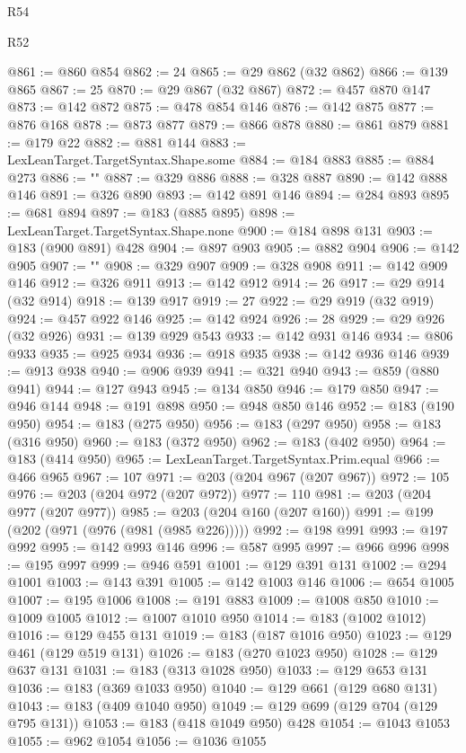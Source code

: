 \begin{lexlean}{R54}
\begin{lexlean}{R52}
\begin{coremodule}
{{{{{{{{{{{{{{{{{{{{{{{{{{{{{{{{{{{{{{{{{{{{{{{{{{{{{{{{{{{{{{{{{{{{{{{{{{{{{{{{{{{{{{{{{{{{{{{{{{{{{{{{{{{{{{{{{{{{{{{{{{{{{{{{{{{{{{{{{{{{{{{{{{{{{{{{{{{{{{{{{{{{{{{{{{{{{{{{{{{{{{{{{{{{{{{{{{{{{{@861 := @860 @854
@862 := 24
@865 := @29 @862 (@32 @862)
@866 := @139 @865
@867 := 25
@870 := @29 @867 (@32 @867)
@872 := @457 @870 @147
@873 := @142 @872
@875 := @478 @854 @146
@876 := @142 @875
@877 := @876 @168
@878 := @873 @877
@879 := @866 @878
@880 := @861 @879
@881 := @179 @22
@882 := @881 @144
@883 := LexLeanTarget.TargetSyntax.Shape.some
@884 := @184 @883
@885 := @884 @273
@886 := "{"
@887 := @329 @886
@888 := @328 @887
@890 := @142 @888 @146
@891 := @326 @890
@893 := @142 @891 @146
@894 := @284 @893
@895 := @681 @894
@897 := @183 (@885 @895)
@898 := LexLeanTarget.TargetSyntax.Shape.none
@900 := @184 @898 @131
@903 := @183 (@900 @891) @428
@904 := @897 @903
@905 := @882 @904
@906 := @142 @905
@907 := "}"
@908 := @329 @907
@909 := @328 @908
@911 := @142 @909 @146
@912 := @326 @911
@913 := @142 @912
@914 := 26
@917 := @29 @914 (@32 @914)
@918 := @139 @917
@919 := 27
@922 := @29 @919 (@32 @919)
@924 := @457 @922 @146
@925 := @142 @924
@926 := 28
@929 := @29 @926 (@32 @926)
@931 := @139 @929 @543
@933 := @142 @931 @146
@934 := @806 @933
@935 := @925 @934
@936 := @918 @935
@938 := @142 @936 @146
@939 := @913 @938
@940 := @906 @939
@941 := @321 @940
@943 := @859 (@880 @941)
@944 := @127 @943
@945 := @134 @850
@946 := @179 @850
@947 := @946 @144
@948 := @191 @898
@950 := @948 @850 @146
@952 := @183 (@190 @950)
@954 := @183 (@275 @950)
@956 := @183 (@297 @950)
@958 := @183 (@316 @950)
@960 := @183 (@372 @950)
@962 := @183 (@402 @950)
@964 := @183 (@414 @950)
@965 := LexLeanTarget.TargetSyntax.Prim.equal
@966 := @466 @965
@967 := 107
@971 := @203 (@204 @967 (@207 @967))
@972 := 105
@976 := @203 (@204 @972 (@207 @972))
@977 := 110
@981 := @203 (@204 @977 (@207 @977))
@985 := @203 (@204 @160 (@207 @160))
@991 := @199 (@202 (@971 (@976 (@981 (@985 @226)))))
@992 := @198 @991
@993 := @197 @992
@995 := @142 @993 @146
@996 := @587 @995
@997 := @966 @996
@998 := @195 @997
@999 := @946 @591
@1001 := @129 @391 @131
@1002 := @294 @1001
@1003 := @143 @391
@1005 := @142 @1003 @146
@1006 := @654 @1005
@1007 := @195 @1006
@1008 := @191 @883
@1009 := @1008 @850
@1010 := @1009 @1005
@1012 := @1007 @1010 @950
@1014 := @183 (@1002 @1012)
@1016 := @129 @455 @131
@1019 := @183 (@187 @1016 @950)
@1023 := @129 @461 (@129 @519 @131)
@1026 := @183 (@270 @1023 @950)
@1028 := @129 @637 @131
@1031 := @183 (@313 @1028 @950)
@1033 := @129 @653 @131
@1036 := @183 (@369 @1033 @950)
@1040 := @129 @661 (@129 @680 @131)
@1043 := @183 (@409 @1040 @950)
@1049 := @129 @699 (@129 @704 (@129 @795 @131))
@1053 := @183 (@418 @1049 @950) @428
@1054 := @1043 @1053
@1055 := @962 @1054
@1056 := @1036 @1055
}}}}}}}}}}}}}}}}}}}}}}}}}}}}}}}}}}}}}}}}}}}}}}}}}}}}}}}}}}}}}}}}}}}}}}}}}}}}}}}}}}}}}}}}}}}}}}}}}}}}}}}}}}}}}}}}}}}}}}}}}}}}}}}}}}}}}}}}}}}}}}}}}}}}}}}}}}}}}}}}}}}}}}}}}}}}}}}}}}}}}}}}}}}}}}}}}}}}}}
\end{coremodule}
\end{lexlean}
\end{lexlean}
